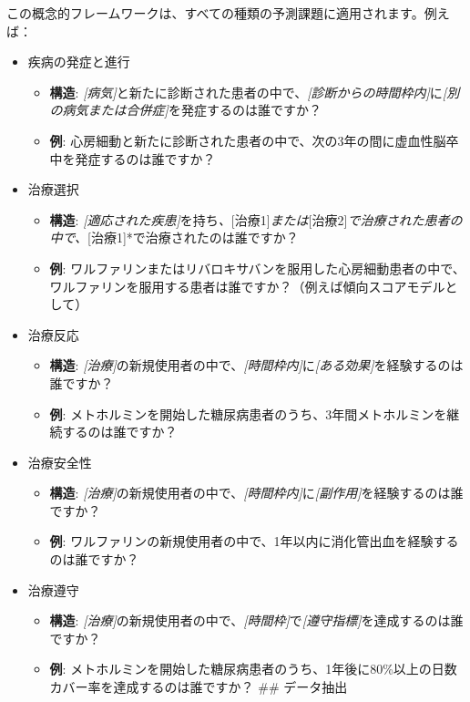 \documentclass[
  11pt]{book}
\providecommand{\tightlist}{%
  \setlength{\itemsep}{0pt}\setlength{\parskip}{0pt}}
\theoremstyle{definition}
\theoremstyle{definition}
\theoremstyle{definition}
\theoremstyle{definition}
\theoremstyle{remark}
\begin{document}
この概念的フレームワークは、すべての種類の予測課題に適用されます。例えば：

\begin{itemize}
\tightlist
\item
  疾病の発症と進行

  \begin{itemize}
  \tightlist
  \item
    \textbf{構造}: \emph{{[}病気{]}}と新たに診断された患者の中で、\emph{{[}診断からの時間枠内{]}}に\emph{{[}別の病気または合併症{]}}を発症するのは誰ですか？
  \item
    \textbf{例}: 心房細動と新たに診断された患者の中で、次の3年の間に虚血性脳卒中を発症するのは誰ですか？
  \end{itemize}
\item
  治療選択

  \begin{itemize}
  \tightlist
  \item
    \textbf{構造}: \emph{{[}適応された疾患{]}}を持ち\emph{、}{[}治療1{]}\emph{または}{[}治療2{]}\emph{で治療された患者の中で、}{[}治療1{]}*で治療されたのは誰ですか？
  \item
    \textbf{例}: ワルファリンまたはリバロキサバンを服用した心房細動患者の中で、ワルファリンを服用する患者は誰ですか？（例えば傾向スコアモデルとして）
  \end{itemize}
\item
  治療反応

  \begin{itemize}
  \tightlist
  \item
    \textbf{構造}: \emph{{[}治療{]}}の新規使用者の中で、\emph{{[}時間枠内{]}}に\emph{{[}ある効果{]}}を経験するのは誰ですか？
  \item
    \textbf{例}: メトホルミンを開始した糖尿病患者のうち、3年間メトホルミンを継続するのは誰ですか？
  \end{itemize}
\item
  治療安全性

  \begin{itemize}
  \tightlist
  \item
    \textbf{構造}: \emph{{[}治療{]}}の新規使用者の中で、\emph{{[}時間枠内{]}}に\emph{{[}副作用{]}}を経験するのは誰ですか？
  \item
    \textbf{例}: ワルファリンの新規使用者の中で、1年以内に消化管出血を経験するのは誰ですか？
  \end{itemize}
\item
  治療遵守

  \begin{itemize}
  \tightlist
  \item
    \textbf{構造}: \emph{{[}治療{]}}の新規使用者の中で、\emph{{[}時間枠{]}}で\emph{{[}遵守指標{]}}を達成するのは誰ですか？
  \item
    \textbf{例}: メトホルミンを開始した糖尿病患者のうち、1年後に80\%以上の日数カバー率を達成するのは誰ですか？
    \#\# データ抽出
  \end{itemize}
\end{itemize}
\end{document}
